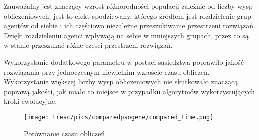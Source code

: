 Zauważalny jest znaczący wzrost różnorodności populacji zależnie od liczby wysp obliczeniowych, jest to efekt spodziewany, którego źródłem jest rozdzielenie grup agentów od siebie i ich częściowo niezależne przeszukiwanie przestrzeni rozwiązań. Dzięki rozdzieleniu agenci wpływają na sebie w mniejszych grupach, przez co są w stanie przeszukać różne częsci przestrzeni rozwiązań.

Wykorzystanie dodatkowego parametru w postaci sąsiedztwa poprawiło jakość rozwiązania przy jednoczesnym niewielkim wzroście czasu obliczeń. Wykorzystanie większej liczby wysp obliczeniowych nie skutkowało znaczącą poprawą jakości, jak miało to miejsce w przypadku algorytmów wykorzystujących kroki ewolucyjne. 



\begin{figure}[H]
\begin{center} 
\texttt{[image: tresc/pics/comparedpsogene/compared\_time.png]}
\caption{Porównanie czasu obliczeń}
\label{fig:compared_time}
\end{center}
\end{figure}



